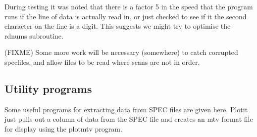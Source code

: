 \documentclass[10pt,a4paper,notitlepage]{article}
\begin{document}
During testing it was noted that there is a factor 5 in the speed that the
program runs if the line of data is actually read in, or just checked 
to see if it the second character on the line is a digit. 
This suggests we might try to optimise the rdnums subroutine.

(FIXME) Some more work will be necessary (somewhere) to catch corrupted 
specfiles, and allow files to be read where scans are not in order. 


\subsection{Utility programs}

Some useful programs for extracting data from SPEC files are given here.
Plotit just pulls out a column of data from the SPEC file and creates
an mtv format file for display using the plotmtv program.
\end{document}
